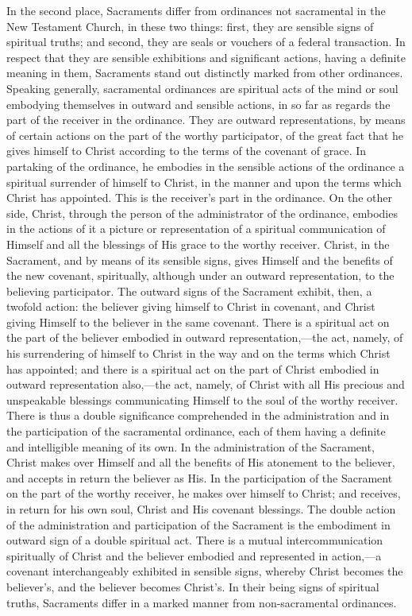 \documentclass[english,]{book}
\begin{document}
In the second place, Sacraments differ from ordinances not sacramental in the New Testament Church, in these two things: first, they are sensible signs of spiritual truths; and second, they are seals or vouchers of a federal transaction. In respect that they are sensible exhibitions and significant actions, having a definite meaning in them, Sacraments stand out distinctly marked from other ordinances. Speaking generally, sacramental ordinances are spiritual acts of the mind or soul embodying themselves in outward and sensible actions, in so far as regards the part of the receiver in the ordinance. They are outward representations, by means of certain actions on the part of the worthy participator, of the great fact that he gives himself to Christ according to the terms of the covenant of grace. In partaking of the ordinance, he embodies in the sensible actions of the ordinance a spiritual surrender of himself to Christ, in the manner and upon the terms which Christ has appointed. This is the receiver's part in the ordinance. On the other side, Christ, through the person of the administrator of the ordinance, embodies in the actions of it a picture or representation of a spiritual communication of Himself and all the blessings of His grace to the worthy receiver. Christ, in the Sacrament, and by means of its sensible signs, gives Himself and the benefits of the new covenant, spiritually, although under an outward representation, to the believing participator. The outward signs of the Sacrament exhibit, then, a twofold action: the believer giving himself to Christ in covenant, and Christ giving Himself to the believer in the same covenant. There is a spiritual act on the part of the believer embodied in outward representation,---the act, namely, of his surrendering of himself to Christ in the way and on the terms which Christ has appointed; and there is a spiritual act on the part of Christ embodied in outward representation also,---the act, namely, of Christ with all His precious and unspeakable blessings communicating Himself to the soul of the worthy receiver. There is thus a double significance comprehended in the administration and in the participation of the sacramental ordinance, each of them having a definite and intelligible meaning of its own. In the administration of the Sacrament, Christ makes over Himself and all the benefits of His atonement to the believer, and accepts in return the believer as His. In the participation of the Sacrament on the part of the worthy receiver, he makes over himself to Christ; and receives, in return for his own soul, Christ and His covenant blessings. The double action of the administration and participation of the Sacrament is the embodiment in outward sign of a double spiritual act. There is a mutual intercommunication spiritually of Christ and the believer embodied and represented in action,---a covenant interchangeably exhibited in sensible signs, whereby Christ becomes the believer's, and the believer becomes Christ's. In their being signs of spiritual truths, Sacraments differ in a marked manner from non-sacramental ordinances.
\end{document}
